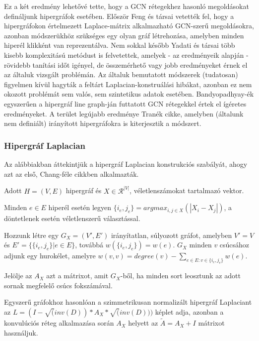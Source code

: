 Ez a két eredmény lehetővé tette, hogy a GCN rétegekhez hasonló megoldásokat defináljunk hipergráfok esetében. Először Feng és társai vetették fel, hogy a hipergráfokon értelmezett Laplace-mátrix alkalmazható GCN-szerű megoldásokra\cite{hgnn}, azonban módszerükhöz szükséges egy olyan gráf létrehozása, amelyben minden hiperél klikként van reprezentálva. Nem sokkal később Yadati és társai több kisebb komplexitású metódust is felvetettek\cite{hgcn}, amelyek - az eredményeik alapján - rövidebb tanítási időt igényel, de összemérhető vagy jobb eredményeket érnek el az általuk vizsgált problémán. Az általuk bemutatott módszerek (tudatosan) figyelmen kívül hagyták a feltárt Laplacian-konstruálási hibákat, azonban ez nem okozott problémát sem valós, sem szintetikus adatok esetében. Bandyopadhyay-ék egyszerűen a hipergráf line graph-ján futtatott GCN rétegekkel értek el ígéretes eredményeket\cite{line_hgnn}. A terület legújabb eredménye Tranék cikke\cite{directed_hgnn}, amelyben (általunk nem definiált) irányított hipergráfokra is kiterjesztik a módszert.

\subsubsection{Hipergráf Laplacian} \label{hypergraphLaplacian}

Az alábbiakban áttekintjük a hipergráf Laplacian konstrukciós szabályát, ahogy azt az első, Chang-féle cikkben alkalmazták\cite{base_hypergraph_laplacian}.


Adott $H=(V,E)$ hipergráf és $X \in \mathcal{R}^{|V|}$, véletlenszámokat tartalmazó vektor.

\begin{compactenum}
	\item Minden $e \in E$ hiperél esetén legyen $\{i_e, j_e\} = argmax_{i,j \in X}(|X_i - X_j|)$, a döntetlenek esetén véletlenszerű választással.
	\item Hozzunk létre egy $G_X=(V',E')$ irányítatlan, súlyozott gráfot, amelyben $V'=V$ és $E'=\{\{i_e, j_e\} | e \in E\}$, továbbá $w(\{i_e, j_e\})=w(e)$. $G_X$ minden $v$ csúcsához adjunk egy hurokélet, amelyre $w(v,v)=degree(v) - \sum_{e \in E : v \in \{i_e, j_e\}} w(e)$.
	\item Jelölje az $A_X$ azt a mátrixot, amit $G_X$-ből, ha minden sort leosztunk az adott sornak megfelelő csúcs fokszámával.
	\item Egyszerű gráfokhoz hasonlóan a szimmetrikusan normalizált hipergráf Laplaciant az $L = (I-\sqrt(inv(D))*A_X*\sqrt(inv(D)))$ képlet adja, azonban a konvulúciós réteg alkalmazása során $A_X$ helyett az $\tilde A = A_X + I$ mátrixot használjuk.
\end{compactenum}

